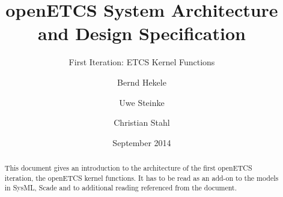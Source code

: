 \documentclass{template/openetcs_article}
\begin{document}
\frontmatter
{}


%




\title{openETCS System Architecture and Design Specification}

\subtitle{First Iteration: ETCS Kernel Functions}

\date{September 2014}



\techassessoraffil{[affiliation]}





\author{Bernd Hekele}


\author{Uwe Steinke}


\author{Christian Stahl}





\begin{abstract}
This document gives an introduction to the architecture of the first openETCS iteration, the openETCS kernel functions. It has to be read as an add-on to the models in SysML, Scade and to additional reading referenced from the document.
\end{abstract}
\end{document}
